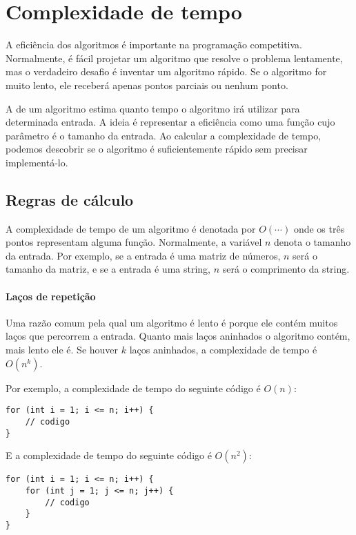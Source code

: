 \chapter{Complexidade de tempo}


A eficiência dos algoritmos é importante na programação competitiva.
Normalmente, é fácil projetar um algoritmo
que resolve o problema lentamente,
mas o verdadeiro desafio é inventar um
algoritmo rápido.
Se o algoritmo for muito lento, ele receberá apenas
pontos parciais ou nenhum ponto.

A  de um algoritmo
estima quanto tempo o algoritmo irá utilizar
para determinada entrada.
A ideia é representar a eficiência
como uma função cujo parâmetro é o tamanho da entrada.
Ao calcular a complexidade de tempo,
podemos descobrir se o algoritmo é suficientemente rápido
sem precisar implementá-lo.

\section{Regras de cálculo}

A complexidade de tempo de um algoritmo
é denotada por $O(\cdots)$
onde os três pontos representam alguma
função.
Normalmente, a variável $n$ denota
o tamanho da entrada.
Por exemplo, se a entrada é uma matriz de números,
$n$ será o tamanho da matriz,
e se a entrada é uma string,
$n$ será o comprimento da string.

\subsubsection*{Laços de repetição}

Uma razão comum pela qual um algoritmo é lento é
porque ele contém muitos laços que percorrem a entrada.
Quanto mais laços aninhados o algoritmo contém,
mais lento ele é.
Se houver $k$ laços aninhados,
a complexidade de tempo é $O(n^k)$.

Por exemplo, a complexidade de tempo do seguinte código é $O(n)$:
\begin{lstlisting}
for (int i = 1; i <= n; i++) {
    // codigo
}
\end{lstlisting}

E a complexidade de tempo do seguinte código é $O(n^2)$:
\begin{lstlisting}
for (int i = 1; i <= n; i++) {
    for (int j = 1; j <= n; j++) {
        // codigo
    }
}
\end{lstlisting}

